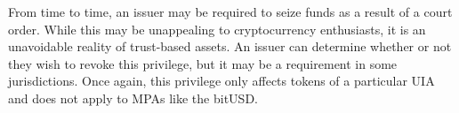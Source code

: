 From time to time, an issuer may be required to seize funds as a result of a
court order. While this may be unappealing to cryptocurrency enthusiasts, it is
an unavoidable reality of trust-based assets. An issuer can determine whether
or not they wish to revoke this privilege, but it may be a requirement in some
jurisdictions. Once again, this privilege only affects tokens of a particular
UIA and does not apply to MPAs like the bitUSD.
